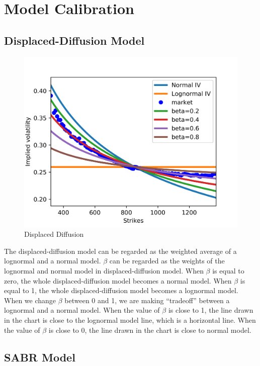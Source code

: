 \documentclass[fleqn,12pt]{SelfArx}
\begin{document}
\onecolumn


\section{Model Calibration}
\subsection{Displaced-Diffusion Model}

\begin{figure}[ht]\centering
	\includegraphics{DD}
	\caption{Displaced Diffusion}
\end{figure}

\noindent The displaced-diffusion model can be regarded as the weighted average of a lognormal and a normal model. $\beta$ can be regarded as the weights of the lognormal and normal model in displaced-diffusion model. When $\beta$ is equal to zero, the whole displaced-diffusion model becomes a normal model. When $\beta$ is equal to 1, the whole displaced-diffusion model becomes a lognormal model. When we change $\beta$ between 0 and 1, we are making “tradeoff” between a lognormal and a normal model. When the value of $\beta$ is close to 1, the line drawn in the chart is close to the lognormal model line, which is a horizontal line. When the value of $\beta$ is close to 0, the line drawn in the chart is close to normal model. 

\subsection{SABR Model}
\end{document}
